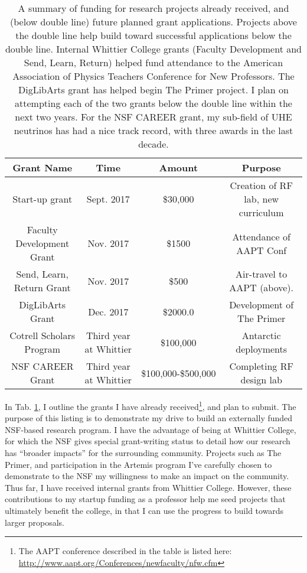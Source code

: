 \documentclass[../../main.tex]{subfiles}
\begin{document}
\begin{table}
\small
\centering
\begin{tabular}{|c|c|c|c|}
\hline \hline
Grant Name & Time & Amount & Purpose \\ \hline
Start-up grant & Sept. 2017 & \$30,000 & Creation of RF lab, new curriculum \\ \hline
Faculty Development Grant & Nov. 2017 & \$1500 & Attendance of AAPT Conf \\ \hline
Send, Learn, Return Grant & Nov. 2017 & \$500 & Air-travel to AAPT (above). \\ \hline
DigLibArts Grant & Dec. 2017 & \$2000.0 & Development of The Primer \\ \hline \hline
Cotrell Scholars Program & Third year at Whittier & \$100,000 & Antarctic deployments \\ \hline
NSF CAREER Grant & Third year at Whittier & \$100,000-\$500,000 & Completing RF design lab \\ \hline
\hline
\end{tabular}
\caption{\label{tab:fund} A summary of funding for research projects already received, and (below double line) future planned grant applications.  Projects above the double line help build toward successful applications below the double line. Internal Whittier College grants (Faculty Development and Send, Learn, Return) helped fund attendance to the American Association of Physics Teachers Conference for New Professors.  The DigLibArts grant has helped begin The Primer project.  I plan on attempting each of the two grants below the double line within the next two years.  For the NSF CAREER grant, my sub-field of UHE neutrinos has had a nice track record, with three awards in the last decade.}
\end{table}

In Tab. \ref{tab:fund}, I outline the grants I have already received\footnote{The AAPT conference described in the table is listed here: \url{http://www.aapt.org/Conferences/newfaculty/nfw.cfm}}, and plan to submit.  The purpose of this listing is to demonstrate my drive to build an externally funded NSF-based research program.  I have the advantage of being at Whittier College, for which the NSF gives special grant-writing status to detail how our research has ``broader impacts'' for the surrounding community.  Projects such as The Primer, and participation in the Artemis program I've carefully chosen to demonstrate to the NSF my willingness to make an impact on the community.  Thus far, I have received internal grants from Whittier College.  However, these contributions to my startup funding as a professor help me seed projects that ultimately benefit the college, in that I can use the progress to build towards larger proposals.  \\ \hspace{0.1cm}
\end{document}
